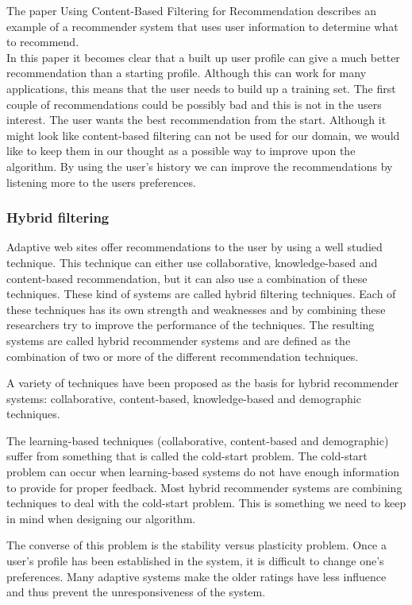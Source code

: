 \documentclass[]{article}
\begin{document}
The paper Using Content-Based Filtering for Recommendation \cite{van2000using} describes an example of a recommender system that uses user information to determine what to recommend.\\
In this paper it becomes clear that a built up user profile can give a much better recommendation than a starting profile.
Although this can work for many applications, this means that the user needs to build up a training set.
The first couple of recommendations could be possibly bad and this is not in the users interest.
The user wants the best recommendation from the start.
Although it might look like content-based filtering can not be used for our domain, we would like to keep them in our thought as a possible way to improve upon the algorithm.
By using the user's history we can improve the recommendations by listening more to the users preferences.

\subsubsection{Hybrid filtering}
Adaptive web sites offer recommendations to the user by using a well studied technique.
This technique can either use collaborative, knowledge-based and content-based recommendation, but it can also use a combination of these techniques.
These kind of systems are called hybrid filtering techniques.
Each of these techniques has its own strength and weaknesses and by combining these researchers try to improve the performance of the techniques.
The resulting systems are called hybrid recommender systems and are defined as the combination of two or more of the different recommendation techniques.

A variety of techniques have been proposed as the basis for hybrid recommender systems: collaborative, content-based, knowledge-based and demographic techniques.

The learning-based techniques (collaborative, content-based and demographic) suffer from something that is called the cold-start problem.
The cold-start problem can occur when learning-based systems do not have enough information to provide for proper feedback.
Most hybrid recommender systems are combining techniques to deal with the cold-start problem.
This is something we need to keep in mind when designing our algorithm.

The converse of this problem is the stability versus plasticity problem.
Once a user's profile has been established in the system, it is difficult to change one's preferences.
Many adaptive systems make the older ratings have less influence and thus prevent the unresponsiveness of the system.
\end{document}
